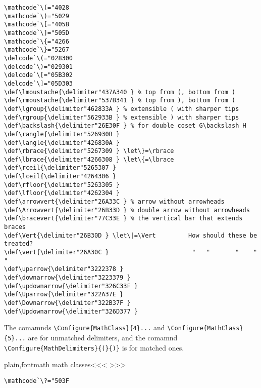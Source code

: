 {{{{{{\begin{verbatim}
\mathcode`\(="4028
\mathcode`\)="5029
\mathcode`\[="405B
\mathcode`\]="505D
\mathcode`\{="4266
\mathcode`\}="5267
\delcode`\(="028300
\delcode`\)="029301
\delcode`\[="05B302
\delcode`\]="05D303
\def\lmoustache{\delimiter"437A340 } % top from (, bottom from )
\def\rmoustache{\delimiter"537B341 } % top from ), bottom from (
\def\lgroup{\delimiter"462833A } % extensible ( with sharper tips
\def\rgroup{\delimiter"562933B } % extensible ) with sharper tips
\def\backslash{\delimiter"26E30F } % for double coset G\backslash H
\def\rangle{\delimiter"526930B }
\def\langle{\delimiter"426830A }
\def\rbrace{\delimiter"5267309 } \let\}=\rbrace
\def\lbrace{\delimiter"4266308 } \let\{=\lbrace
\def\rceil{\delimiter"5265307 }
\def\lceil{\delimiter"4264306 }
\def\rfloor{\delimiter"5263305 }
\def\lfloor{\delimiter"4262304 }
\def\arrowvert{\delimiter"26A33C } % arrow without arrowheads
\def\Arrowvert{\delimiter"26B33D } % double arrow without arrowheads
\def\bracevert{\delimiter"77C33E } % the vertical bar that extends braces
\def\Vert{\delimiter"26B30D } \let\|=\Vert         How should these be treated?
\def\vert{\delimiter"26A30C }                       "   "       "    "   "
\def\uparrow{\delimiter"3222378 }
\def\downarrow{\delimiter"3223379 }
\def\updownarrow{\delimiter"326C33F }
\def\Uparrow{\delimiter"322A37E }
\def\Downarrow{\delimiter"322B37F }
\def\Updownarrow{\delimiter"326D377 }
\end{verbatim}

The comamnds \verb'\Configure{MathClass}{4}...'
and \verb'\Configure{MathClass}{5}...'
are for unmatched delimiters, and the comamnd
\verb'\Configure{MathDelimiters}{(}{)}' is for matched ones.


\<plain,fontmath math classes\><<<
>>>

\begin{verbatim}
\mathcode`\?="503F
\end{verbatim}

}}}}}}
